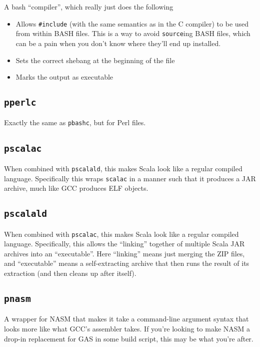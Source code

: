 \documentclass{article}
\begin{document}
A bash ``compiler'', which really just does the following
\begin{itemize}
\item Allows \texttt{\#include} (with the same semantics as in the C
  compiler) to be used from within BASH files.  This is a way to avoid
  \texttt{source}ing BASH files, which can be a pain when you don't
  know where they'll end up installed.
\item Sets the correct shebang at the beginning of the file
\item Marks the output as executable
\end{itemize}

\subsection{\texttt{pperlc} \label{prog:pperlc}}

Exactly the same as \texttt{pbashc}, but for Perl files.

\subsection{\texttt{pscalac} \label{prog:pscalac}}

When combined with \texttt{pscalald}, this makes Scala look like a
regular compiled language.  Specifically this wraps \texttt{scalac} in
a manner such that it produces a JAR archive, much like GCC produces
ELF objects.

\subsection{\texttt{pscalald} \label{prog:pscalald}}

When combined with \texttt{pscalac}, this makes Scala look like a
regular compiled language.  Specifically, this allows the ``linking''
together of multiple Scala JAR archives into an ``executable''.  Here
``linking'' means just merging the ZIP files, and ``executable'' means
a self-extracting archive that then runs the result of its extraction
(and then cleans up after itself).

\subsection{\texttt{pnasm} \label{prog:pnasm}}

A wrapper for NASM that makes it take a command-line argument syntax
that looks more like what GCC's assembler takes.  If you're looking to
make NASM a drop-in replacement for GAS in some build script, this may
be what you're after.
\end{document}
